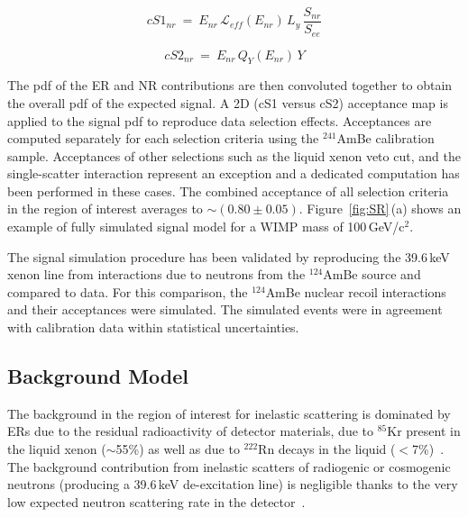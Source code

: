 \begin{equation}
cS1_{nr} ~=~ E_{nr} \, \mathcal{L}_{eff}(E_{nr}) \, L_{y} \, \frac{S_{nr}}{S_{ee}}
\label{f:cs1}
\end{equation}

\begin{equation}
cS2_{nr}  ~ = ~ E_{nr} \, Q_{Y}(E_{nr}) \, Y
\label{f:cs2}
\end{equation}

The pdf of the ER and NR contributions are then convoluted together to obtain the overall pdf of the expected signal.
A 2D (cS1 versus cS2) acceptance map is applied to the signal pdf to reproduce data selection effects. Acceptances are computed separately for each selection 
criteria using the $^{241}$AmBe calibration sample. Acceptances of other selections such as the liquid xenon veto cut, and the single-scatter interaction represent an exception  and 
a dedicated computation has been performed in these cases. The combined acceptance  of all selection criteria in the region of interest averages to $\sim$$(0.80\pm0.05)$. 
Figure~\ref{fig:SR}\,(a) shows an example of fully simulated signal model for a WIMP mass of 100\,GeV/c$^2$. 

The signal simulation procedure has been validated by reproducing the 39.6\,keV xenon line from interactions due to neutrons from the 
$^{124}$AmBe source and compared to data. For this comparison, the  $^{124}$AmBe nuclear recoil interactions and their acceptances
were simulated. The simulated events were in agreement  with calibration data within statistical uncertainties. 



\subsection {Background Model}

The background in the region of interest for inelastic scattering is dominated by ERs due to the residual radioactivity of detector materials, due to $^{85}$Kr present in the liquid xenon ($\sim$55\%) as well as due to $^{222}$Rn decays in the liquid ($<$7\%)~\cite{Aprile:2011vb}. The background contribution from inelastic scatters of radiogenic or cosmogenic neutrons (producing a 39.6\,keV de-excitation line) is negligible thanks to the very low expected neutron scattering rate in the detector~\cite{Aprile:2013tov}.


